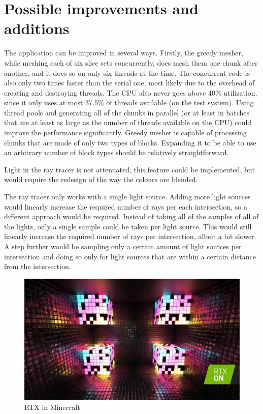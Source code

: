 \documentclass[times, utf8, zavrsni, numeric]{fer}
\begin{document}
\section{Possible improvements and additions}
The application can be improved in several ways. Firstly, the greedy mesher, while meshing each of six slice sets concurrently, does mesh them one chunk after another, and it does so on only six threads at the time. The concurrent code is also only two times faster than the serial one, most likely due to the overhead of creating and destroying threads. The CPU also never goes above 40\% utilization, since it only uses at most 37.5\% of threads available (on the test system). Using thread pools and generating all of the chunks in parallel (or at least in batches that are at least as large as the number of threads available on the CPU) could improve the performance significantly.
Greedy mesher is capable of processing chunks that are made of only two types of blocks. Expanding it to be able to use an arbitrary number of block types should be relatively straightforward.

Light in the ray tracer is not attenuated, this feature could be implemented, but would require the redesign of the way the colours are blended.

The ray tracer only works with a single light source. Adding more light sources would linearly increase the required number of rays per each intersection, so a different approach would be required. Instead of taking all of the samples of all of the lights, only a single sample could be taken per light source. This would still linearly increase the required number of rays per intersection, albeit a bit slower. A step further would be sampling only a certain amount of light sources per intersection and doing so only for light sources that are within a certain distance from the intersection.

\begin{center}
\begin{figure}[H]
\includegraphics[width=1\textwidth]{rtx_on.jpg}
\caption{RTX in Minecraft}
\end{figure}
\label{image:rtx_on}
\end{center}
\end{document}
